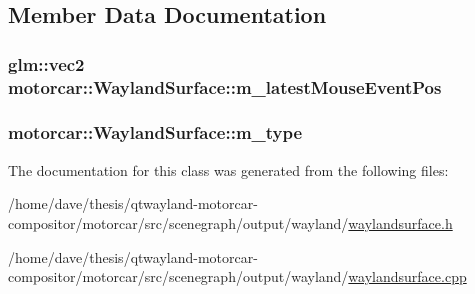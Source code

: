 \subsection{Member Data Documentation}
\hypertarget{classmotorcar_1_1WaylandSurface_a9a0fa2f9278e18b7fb53276cf32d000d}{
\subsubsection[{m\-\_\-latest\-Mouse\-Event\-Pos}]{\setlength{\rightskip}{0pt plus 5cm}glm\-::vec2 motorcar\-::\-Wayland\-Surface\-::m\-\_\-latest\-Mouse\-Event\-Pos\hspace{0.3cm}{\ttfamily [protected]}}}\label{classmotorcar_1_1WaylandSurface_a9a0fa2f9278e18b7fb53276cf32d000d}
\hypertarget{classmotorcar_1_1WaylandSurface_a73fc5c245e98a08a551c7f412fd95966}{
\subsubsection[{m\-\_\-type}]{ motorcar\-::\-Wayland\-Surface\-::m\-\_\-type\hspace{0.3cm}{\ttfamily [protected]}}}\label{classmotorcar_1_1WaylandSurface_a73fc5c245e98a08a551c7f412fd95966}


The documentation for this class was generated from the following files\-:\begin{DoxyCompactItemize}
\item 
/home/dave/thesis/qtwayland-\/motorcar-\/compositor/motorcar/src/scenegraph/output/wayland/\hyperlink{waylandsurface_8h}{waylandsurface.\-h}\item 
/home/dave/thesis/qtwayland-\/motorcar-\/compositor/motorcar/src/scenegraph/output/wayland/\hyperlink{waylandsurface_8cpp}{waylandsurface.\-cpp}\end{DoxyCompactItemize}
